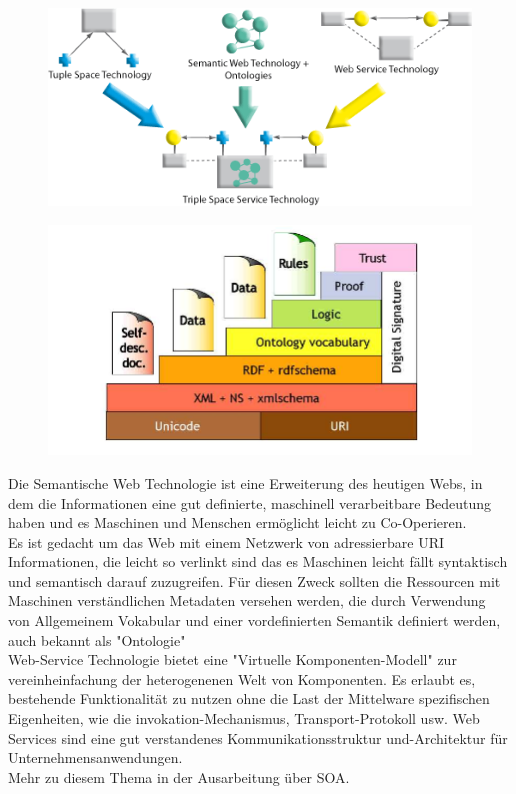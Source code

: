 \documentclass[a4paper,12pt]{scrreprt}
\begin{document}
		

\begin{figure}[h]
\centering
\includegraphics[width=0.7\linewidth]{./tripcom_overview2}
\caption{}
\label{fig:tripcom_overview2}
\end{figure}
\begin{figure}[h]
\centering
\includegraphics[width=0.7\linewidth]{./Semantic_Web_www_tripcom_org_docs_coordination07_paper}
\caption{}
\label{fig:Semantic_Web_www_tripcom_org_docs_coordination07_paper}
\end{figure} %
		
		
	
		
			Die Semantische Web Technologie ist eine Erweiterung des heutigen Webs, in dem die Informationen eine gut definierte, maschinell verarbeitbare Bedeutung haben und es Maschinen und Menschen ermöglicht leicht zu Co-Operieren.\\
				Es ist gedacht um das Web mit einem Netzwerk von adressierbare URI Informationen, die leicht so verlinkt sind das es Maschinen leicht fällt syntaktisch und semantisch darauf zuzugreifen.
				Für diesen Zweck sollten die Ressourcen mit Maschinen verständlichen Metadaten versehen werden, die durch Verwendung von Allgemeinem Vokabular und einer vordefinierten Semantik definiert werden, auch bekannt als "Ontologie"
				\\
			
	

		
			
		
		
		Web-Service Technologie bietet eine 
		"Virtuelle Komponenten-Modell" zur vereinheinfachung der 
		heterogenenen Welt von Komponenten. Es  erlaubt es, bestehende Funktionalität zu nutzen 
		ohne die Last der Mittelware spezifischen Eigenheiten, wie die invokation-Mechanismus, Transport-Protokoll usw. Web Services sind eine gut verstandenes Kommunikationsstruktur und-Architektur für Unternehmensanwendungen.\\ Mehr zu diesem Thema in der Ausarbeitung über SOA.
		
\end{document}
